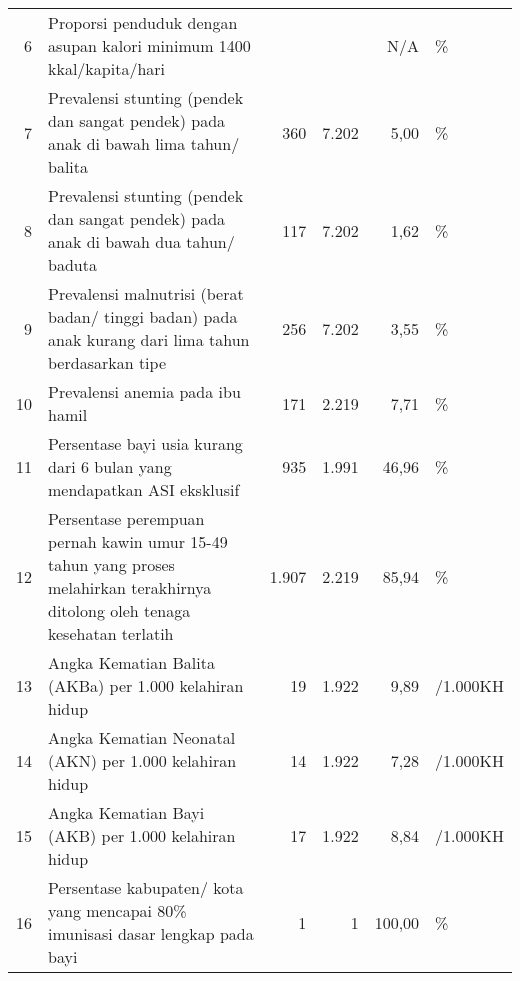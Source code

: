 \begin{center}
\begin{longtable}{rY{12em}rrrY{6em}}
                   6 & Proporsi penduduk dengan asupan kalori minimum 1400 kkal/kapita/hari                                                           &         &         &    N/A & \%                  \\
                   7 & Prevalensi stunting (pendek dan sangat pendek) pada anak di bawah lima tahun/ balita                                           					&     360 &   7.202 &   5,00 & \%                  \\
                    8 & Prevalensi stunting (pendek dan sangat pendek) pada anak di bawah dua tahun/ baduta                                           &     117 &   7.202  &   1,62 & \%                  \\
                   9 & Prevalensi malnutrisi (berat badan/ tinggi badan) pada anak kurang dari lima tahun berdasarkan tipe                            					&     256 &   7.202 &   3,55 & \%                  \\
                   10 & Prevalensi anemia pada ibu hamil                                                                                              &     171 &   2.219 &   7,71 & \%                  \\
                   11 & Persentase bayi usia kurang dari 6 bulan yang mendapatkan ASI eksklusif                                                        					&     935 &   1.991 &  46,96 & \%                  \\
                   12 & Persentase perempuan pernah kawin umur 15-49 tahun yang proses melahirkan terakhirnya ditolong oleh tenaga kesehatan terlatih &   1.907 &   2.219 &  85,94 & \%                  \\
                   13 & Angka Kematian Balita (AKBa) per 1.000 kelahiran hidup                                                                         					&      19 &   1.922 &   9,89 & /1.000KH            \\
                   14 & Angka Kematian Neonatal (AKN) per 1.000 kelahiran hidup                                                                       &      14 &   1.922 &   7,28 & /1.000KH            \\
                   15 & Angka Kematian Bayi (AKB) per 1.000 kelahiran hidup                                                                            					&      17 &   1.922 &   8,84 & /1.000KH            \\
                   16 & Persentase kabupaten/ kota yang mencapai 80\% imunisasi dasar lengkap pada bayi                                               &       1 &       1 & 100,00 & \%                  \\

\end{longtable}
\end{center}
